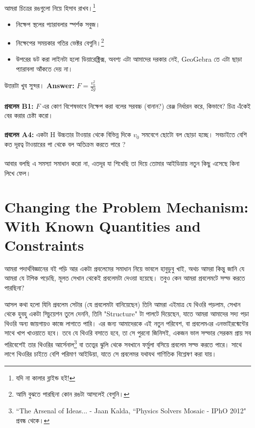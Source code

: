 \documentclass[12pt,a4paper]{article}
\begin{document}
আমরা চিত্রের রঙগুলো নিয়ে হিসাব রাখব।\footnote{যদি না কালার ব্লাইন্ড হই!}
\begin{itemize}
\item {\color{green} নিক্ষেপ স্থলের প্যারাবলার স্পর্শক সবুজ।}
\item {\color{blue} নিক্ষেপের সময়কার গতির ভেক্টর বেগুনি।\footnote{আমি বুঝতে পারছিনা কোন রঙটা আসলেই বেগুনি।}}
\item উপরের ডট করা লাইনটা হলো ডিয়ারেক্ট্রিক্স, অবশ্য এটা আমাদের দরকার নেই, GeoGebra তে এটা ছাড়া প্যারাবলা আঁকতে দেয় না।
\end{itemize}
উত্তরটা খুব সুন্দর।
\textbf{ Answer:} $F = \frac{v_0^2}{2g} $\\
\\
\textbf{প্রবলেম B1:} $F$ এর কোণ বিশেষভাবে নিক্ষেপ করা বলের সরবচ্চ (বানান?) রেঞ্জ নির্ধারন করে, কিভাবে? চিত্র এঁকেই বের করার চেষ্টা করো। \\
\\
\textbf{প্রবলেম A4:} একটা H উচ্চতার টাওয়ার থেকে বিভিন্ন দিকে $v_0$ সমবেগে ছোটো বল ছোড়া হচ্ছে। সবচাইতে বেশি কত দূরত্ব টাওয়ারের পা থেকে বল অতিক্রম করতে পারে ?\\
\\
আবার বলছি এ সমস্যা সমাধান করো না, এতদূর যা শিখেছি তা দিয়ে তোমার আইডিয়ায় নতুন কিছু এসেছে কিনা লিখে ফেল। 

%
%
\section{Changing the Problem Mechanism:\\With Known Quantities and Constraints}
আমরা পদার্থবিজ্ঞানের বই পড়ি আর একটা প্রবলেমের সমাধান নিয়ে ভাবলে হাবুডুবু খাই, অথচ আমরা কিন্তু জানি যে আমরা যে টপিক পড়েছি, মূলত সেখান থেকেই প্রবলেমটা দেওয়া হয়েছে। তবুও কেন আমরা প্রবলেমটে সল্ভ করতে পারছিনা?


আসল কথা হলো যিনি প্রবলেম সেটার (যে প্রবলেমটা বানিয়েছেন) তিনি আমরা এইমাত্র যে থিওরি পড়লাম, সেখান থেকে হুবহু একটা সিচুয়েশন তুলে দেননি, তিনি "Structure" টা পালটে দিয়েছেন, যাতে আমরা আমাদের সদ্য পড়া থিওরি অন্য জায়গায়ও কাজে লাগাতে পারি। এর জন্য আমাদেরকে এই নতুন পরিবেশ, বা প্রবলেমএর এনভাইরন্মেন্টের সাথে খাপ খাওয়াতে হবে। তবে যে থিওরি বসাতে হবে, তা সে পুরনো জিনিসই, একজন ভাল সল্ভার সেরকম প্রায় সব পরিবেশেই তার থিওরির আর্সেনাল\footnote{``The Arsenal of Ideas... - Jaan Kalda, ``Physics Solvers Mosaic - IPhO 2012" প্রবন্ধ থেকে।} বা তত্ত্বের ঝুলি থেকে সবখানে ফর্মুলা বসিয়ে প্রবলেম সল্ভ করতে পারে। সাথে লাগে থিওরির চাইতে বেশি পরিমাণ আইডিয়া, যাতে সে প্রবলেমর যথাযথ গাণিতিক বিশ্লেষণ করা যায়। 
\end{document}
